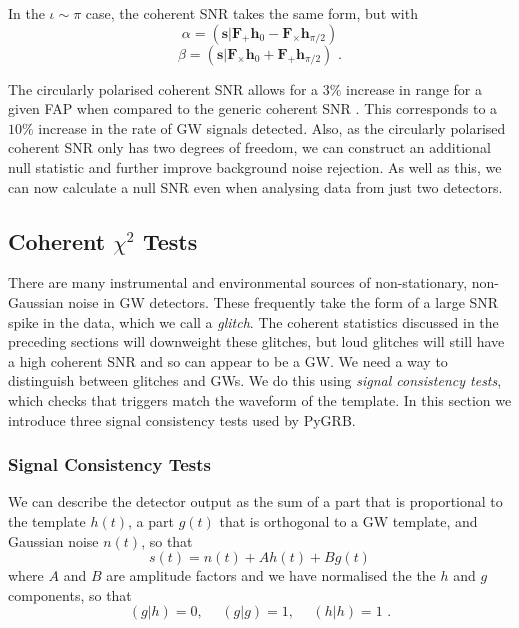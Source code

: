 \documentclass[11pt]{cuthesis}
\newcommand{\fs}{\text{ .}}
\begin{document}
In the $\iota \sim \pi$ case, the coherent SNR takes the same form, but with
\begin{equation}
\alpha = (\textbf{s}|\textbf{F}_+\textbf{h}_0 - \textbf{F}_\times \textbf{h}_{\pi /2} )
\end{equation}
\begin{equation}
\beta =  (\textbf{s}|\textbf{F}_\times\textbf{h}_0 + \textbf{F}_+ \textbf{h}_{\pi /2} ) \fs
\end{equation}

The circularly polarised coherent SNR allows for a $3\%$ increase in range for a given FAP when compared to the generic coherent SNR \cite{pygrb_Williamson:2014}. This corresponds to a $10\%$ increase in the rate of GW signals detected. Also, as the circularly polarised coherent SNR only has two degrees of freedom, we can construct an additional null statistic and further improve background noise rejection. As well as this, we can now calculate a null SNR even when analysing data from just two detectors.

\subsection{Coherent $\chi^2$ Tests} \label{sec:coh chisq}
There are many instrumental and environmental sources of non-stationary, non-Gaussian noise in GW detectors. These frequently take the form of a large SNR spike in the data, which we call a \textit{glitch}. The coherent statistics discussed in the preceding sections will downweight these glitches, but loud glitches will still have a high coherent SNR and so can appear to be a GW. We need a way to distinguish between glitches and GWs. We do this using \textit{signal consistency tests}, which checks that triggers match the waveform of the template. In this section we introduce three signal consistency tests used by PyGRB.

\subsubsection{Signal Consistency Tests }
We can describe the detector output as the sum of a part that is proportional to the template $h(t)$, a part $g(t)$ that is orthogonal to a GW template, and Gaussian noise $n(t)$, so that
\begin{equation}
s(t) = n(t) + Ah(t) + Bg(t)
\end{equation}
where $A$ and $B$ are amplitude factors and we have normalised the the $h$ and $g$ components, so that
\begin{equation}
(g|h)=0, \hspace{15pt} (g|g)=1, \hspace{15pt} (h|h)=1 \fs
\end{equation}
\end{document}
